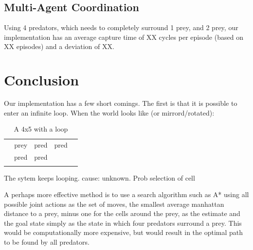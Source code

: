 \documentclass[10pt]{article}
\begin{document}
\subsection{Multi-Agent Coordination}
Using 4 predators, which needs to completely surround 1 prey, and 2 prey, our implementation has an average capture time of XX cycles per episode (based on XX episodes) and a deviation of XX. 


\section{Conclusion}\label{conclusion}
%
Our implementation has a few short comings. The first is that it is possible to enter an infinite loop. When the world looks like (or mirrord/rotated):

\begin{table}[h!tb]
\centering
	\caption{A 4x5 with a loop}
\label{tab_loop}
\begin{tabular}{|c|c|c|c|c|}\hline
	 &  & & & \\ \hline
	 & prey & pred & pred & \\ \hline
	 & pred & pred & & \\ \hline
	 &  & & & \\ \hline
\end{tabular}
\end{table}

The sytem keeps looping. cause: unknown. Prob selection of cell


A perhaps more effective method is to use a search algorithm such as A* using all possible joint actions as the set of moves, the smallest average manhattan distance to a prey, minus one for the cells around the prey, as the estimate and the goal state simply as the state in which four predators surround a prey. This would be computationally more expensive, but would result in the optimal path to be found by all predators.



 \pagebreak

  
 
 \pagebreak
 \appendix
\end{document}
